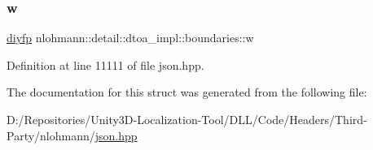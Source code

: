 \subsubsection{\texorpdfstring{w}{w}}
{\footnotesize\ttfamily \mbox{\hyperlink{structnlohmann_1_1detail_1_1dtoa__impl_1_1diyfp}{diyfp}} nlohmann\+::detail\+::dtoa\+\_\+impl\+::boundaries\+::w}



Definition at line 11111 of file json.\+hpp.



The documentation for this struct was generated from the following file\+:\begin{DoxyCompactItemize}
\item 
D\+:/\+Repositories/\+Unity3\+D-\/\+Localization-\/\+Tool/\+D\+L\+L/\+Code/\+Headers/\+Third-\/\+Party/nlohmann/\mbox{\hyperlink{json_8hpp}{json.\+hpp}}\end{DoxyCompactItemize}
